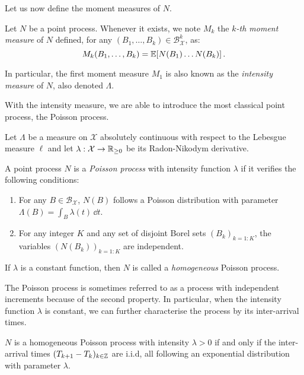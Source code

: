 Let us now define the moment measures of $N$.
\begin{definition}
    Let $N$ be a point process. Whenever it exists, we note $M_k$ the \emph{$k$-th moment measure} of $N$ defined, for any $(B_1,\ldots, B_k)\in\mathcal{B}_{\mathcal{X}}^k$, as:
    \[M_k(B_1, \ldots, B_k) = {\mathbb E}[N(B_1)\ldots N(B_k)]\,.\]

    In particular, the first moment measure $M_1$ is also known as the \emph{intensity measure} of $N$, also denoted $\Lambda$.
\end{definition}
With the intensity measure, we are able to introduce the most classical point process, the Poisson process.

\begin{definition}\label{def:chap1_poisson_process}
    Let $\Lambda$ be a measure on $\mathcal{X}$ absolutely continuous with respect to the Lebesgue measure $\ell$ and let $\lambda:\mathcal{X}\to{\mathbb R}_{\geq0}$ be its Radon-Nikodym derivative.

    A point process $N$ is a \emph{Poisson process} with intensity function $\lambda$ if it verifies the following conditions:
    \begin{enumerate}
        \item For any $B\in\mathcal{B}_{\mathcal{X}}$, $N(B)$ follows a Poisson distribution with parameter $\Lambda(B) = \int_{B}{\lambda(t)\,\dd t}$.
        \item For any integer $K$ and any set of disjoint Borel sets $(B_k)_{k=1:K}$, the variables $(N(B_k))_{k=1:K}$ are independent.
    \end{enumerate}

    If $\lambda$ is a constant function, then $N$ is called a \emph{homogeneous} Poisson process.
\end{definition}
The Poisson process is sometimes referred to as a process with independent increments because of the second property.
In particular, when the intensity function $\lambda$ is constant, we can further characterise the process by its inter-arrival times.

\begin{theorem}{\parencite[Theorem 7.2]{Last2017}}\label{th:chap1_interarrival_exponential}

    $N$ is a homogeneous Poisson process with intensity $\lambda > 0$ if and only if the inter-arrival times $(T_{k+1} - T_k)_{k\in{\mathbb Z}}$ are i.i.d, all following an exponential distribution with parameter $\lambda$.
\end{theorem}

